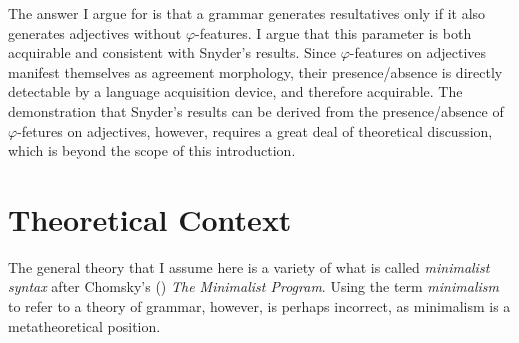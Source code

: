 \documentclass[MilwayThesis]{subfiles}
\begin{document}
The answer I argue for is that a grammar generates resultatives only if it also generates adjectives without $\varphi$-features.
I argue that this parameter is both acquirable and consistent with Snyder's results.
Since $\varphi$-features on adjectives manifest themselves as agreement morphology, their presence/absence is directly detectable by a language acquisition device, and therefore acquirable.
The demonstration that Snyder's results can be derived from the presence/absence of $\varphi$-fetures on adjectives, however, requires a great deal of theoretical discussion, which is beyond the scope of this introduction.

\section{Theoretical Context}
The general theory that I assume here is a variety of what is called \textit{minimalist syntax} after Chomsky's (\citeyear{chomsky1995minimalist}) \textit{The Minimalist Program}.
Using the term \textit{minimalism} to refer to a theory of grammar, however, is perhaps incorrect, as minimalism is a metatheoretical position.
\end{document}
